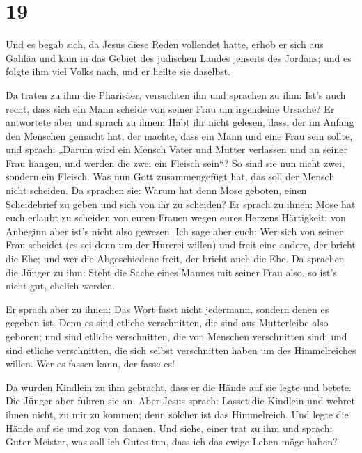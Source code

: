 \hypertarget{section-18}{%
\section{19}\label{section-18}}

 Und es begab sich, da Jesus diese Reden vollendet hatte,
erhob er sich aus Galiläa und kam in das Gebiet des jüdischen Landes
jenseits des Jordans;  und es folgte ihm viel Volks nach,
und er heilte sie daselbst.

 Da traten zu ihm die Pharisäer, versuchten ihn und
sprachen zu ihm: Ist's auch recht, dass sich ein Mann scheide von seiner
Frau um irgendeine Ursache?  Er antwortete aber und sprach
zu ihnen: Habt ihr nicht gelesen, dass, der im Anfang den Menschen
gemacht hat, der machte, dass ein Mann und eine Frau sein sollte,
 und sprach: „Darum wird ein Mensch Vater und Mutter
verlassen und an seiner Frau hangen, und werden die zwei ein Fleisch
sein``?  So sind sie nun nicht zwei, sondern ein Fleisch.
Was nun Gott zusammengefügt hat, das soll der Mensch nicht scheiden.
 Da sprachen sie: Warum hat denn Mose geboten, einen
Scheidebrief zu geben und sich von ihr zu scheiden?  Er
sprach zu ihnen: Mose hat euch erlaubt zu scheiden von euren Frauen
wegen eures Herzens Härtigkeit; von Anbeginn aber ist's nicht also
gewesen.  Ich sage aber euch: Wer sich von seiner Frau
scheidet (es sei denn um der Hurerei willen) und freit eine andere, der
bricht die Ehe; und wer die Abgeschiedene freit, der bricht auch die
Ehe.  Da sprachen die Jünger zu ihm: Steht die Sache
eines Mannes mit seiner Frau also, so ist's nicht gut, ehelich werden.

 Er sprach aber zu ihnen: Das Wort fasst nicht jedermann,
sondern denen es gegeben ist.  Denn es sind etliche
verschnitten, die sind aus Mutterleibe also geboren; und sind etliche
verschnitten, die von Menschen verschnitten sind; und sind etliche
verschnitten, die sich selbst verschnitten haben um des Himmelreiches
willen. Wer es fassen kann, der fasse es!

 Da wurden Kindlein zu ihm gebracht, dass er die Hände
auf sie legte und betete. Die Jünger aber fuhren sie an. 
Aber Jesus sprach: Lasset die Kindlein und wehret ihnen nicht, zu mir zu
kommen; denn solcher ist das Himmelreich.  Und legte die
Hände auf sie und zog von dannen.  Und siehe, einer trat
zu ihm und sprach: Guter Meister, was soll ich Gutes tun, dass ich das
ewige Leben möge haben?

